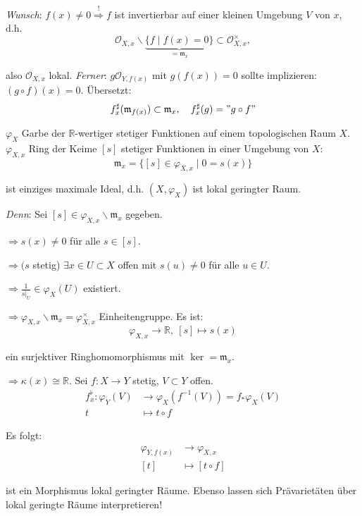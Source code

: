 \emph{Wunsch}: $f(x)\neq0\overset{!}{\Rightarrow}f$ ist invertierbar
auf einer kleinen Umgebung $V$ von $x$, d.h. 
\[
\mathcal{O}_{X,x}\backslash\underbrace{\{f\mid f(x)=0\}}_{=\mathfrak{m}_{x}}\subset\mathcal{O}_{X,x}^{\times},
\]

also $\mathcal{O}_{X,x}$ lokal. \emph{Ferner}: $g\mathcal{O}_{Y,f(x)}$
mit $g(f(x))=0$ sollte implizieren: $(g\circ f)(x)=0$. Übersetzt:
\[
f_{x}^{\sharp}(\mathfrak{m}_{f(x)})\subset\mathfrak{m}_{x},\quad f_{x}^{\sharp}(g)="g\circ f"
\]

\begin{example}[orig. 32]
  $\varphi_{X}$ Garbe der $\mathbb{R}$-wertiger stetiger Funktionen
  auf einem topologischen Raum $X$. $\varphi_{X,x}$ Ring der Keime
  $[s]$ stetiger Funktionen in einer Umgebung von $X$:
  \[
  \mathfrak{m}_{x}=\{[s]\in\varphi_{X,x}\mid0=s(x)\}
  \]

  ist einziges maximale Ideal, d.h. $(X,\varphi_{X})$ ist lokal geringter
  Raum. 

  \emph{Denn}: Sei $[s]\in\varphi_{X,x}\backslash\mathfrak{m}_{x}$
  gegeben.

  $\Rightarrow s(x)\neq0$ für alle $s\in[s]$. 

  $\Rightarrow(s$ stetig) $\exists x\in U\subset X$ offen mit $s(u)\neq0$
  für alle $u\in U$.

  $\Rightarrow\frac{1}{s|_{U}}\in\varphi_{X}(U)$ existiert.

  $\Rightarrow\varphi_{X,x}\backslash\mathfrak{m}_{x}=\varphi_{X,x}^{\times}$
  Einheitengruppe. Es ist: 
  \[
  \varphi_{X,x}\rightarrow\mathbb{R},\ [s]\mapsto s(x)
  \]

  ein surjektiver Ringhomomorphismus mit $\ker=\mathfrak{m}_{x}$.

  $\Rightarrow\kappa(x)\cong\mathbb{R}$. Sei $f:X\rightarrow Y$ stetig,
  $V\subset Y$ offen.
  \begin{align*}
    f_{x}^{\flat}:\varphi_{Y}(V) & \longrightarrow\varphi_{X}(f^{-1}(V))=f_{\ast}\varphi_{X}(V)\\
    t & \longmapsto t\circ f
  \end{align*}

  Es folgt:
  \begin{align*}
    \varphi_{Y,f(x)} & \longrightarrow\varphi_{X,x}\\{}
           [t] & \longmapsto[t\circ f]
  \end{align*}

  ist ein Morphismus lokal geringter Räume. Ebenso lassen sich Prävarietäten
  über lokal geringte Räume interpretieren!
\end{example}
